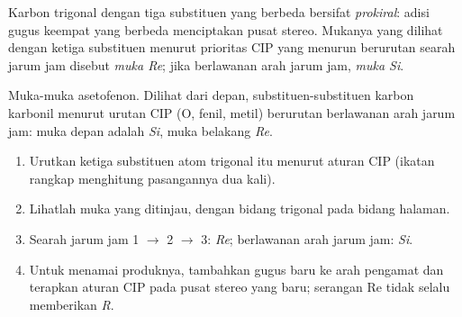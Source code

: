 \begin{definition}\label{def:b3:asymmetric-synthesis:faces}
Karbon trigonal dengan tiga substituen yang berbeda bersifat \emph{prokiral}:
adisi gugus keempat yang berbeda menciptakan pusat stereo. Mukanya yang dilihat dengan
ketiga substituen menurut prioritas CIP yang menurun berurutan searah jarum jam disebut
\emph{muka Re}; jika berlawanan arah jarum jam, \emph{muka Si}.
\end{definition}

\begin{omfigure}

{\small Muka-muka asetofenon. Dilihat dari depan, substituen-substituen
karbon karbonil menurut urutan CIP (O, fenil, metil) berurutan berlawanan arah jarum jam: muka
depan adalah \textit{Si}, muka belakang \textit{Re}.}
\end{omfigure}

\begin{method}\label{met:b3:asymmetric-synthesis:re-si}
\begin{enumerate}
  \item Urutkan ketiga substituen atom trigonal itu menurut aturan CIP (ikatan
        rangkap menghitung pasangannya dua kali).
  \item Lihatlah muka yang ditinjau, dengan bidang trigonal pada bidang halaman.
  \item Searah jarum jam 1 $\to$ 2 $\to$ 3: \textit{Re}; berlawanan arah jarum jam: \textit{Si}.
  \item Untuk menamai produknya, tambahkan gugus baru ke arah pengamat dan terapkan
        aturan CIP pada pusat stereo yang baru; serangan Re tidak selalu memberikan \textit{R}.
\end{enumerate}
\end{method}

